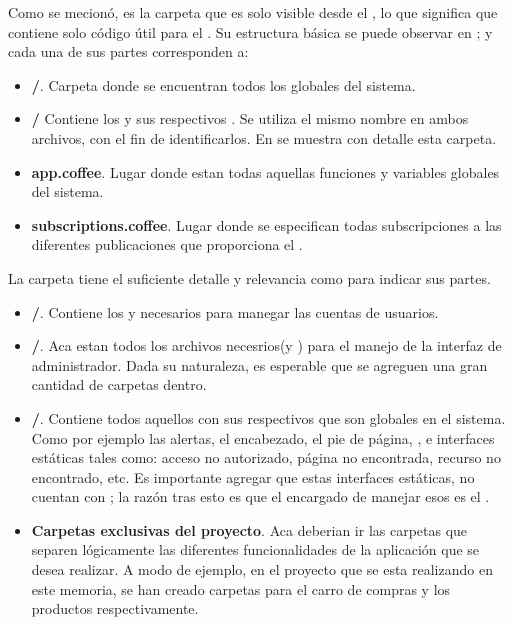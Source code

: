 Como se mecionó, \clientFolder es la carpeta que es solo visible desde el \clientSideAS, lo que significa que contiene solo código útil para el \clientAS. Su estructura básica se puede observar en ; y cada una de sus partes corresponden a:

	\begin{itemize}
		\item
			\textbf{\helpersMETEOR/}. Carpeta donde se encuentran todos los \helpersMETEOR globales del sistema.
		\item
			\textbf{\templatesMETEOR/} Contiene los \templatesMETEOR y sus respectivos \helpersMETEOR. Se utiliza el mismo nombre en ambos archivos, con el fin de identificarlos. En  se muestra con detalle esta carpeta.
		\item
			\textbf{app.coffee}. Lugar donde estan todas aquellas funciones y variables globales del sistema.
		\item
			\textbf{subscriptions.coffee}. Lugar donde se especifican todas subscripciones a las diferentes publicaciones que proporciona el \serverAS.
	\end{itemize}



La carpeta 	\templateMETEOR tiene el suficiente detalle y relevancia como para indicar sus partes.

\begin{itemize}
	\item
		\textbf{\folderAccount/}. Contiene los \templatesMETEOR y \helpersMETEOR necesarios para manegar las cuentas de usuarios. 
	\item
		\textbf{\folderDashboard/}. Aca estan todos los archivos necesrios(\templatesMETEOR y \helpersMETEOR) para el manejo de la interfaz de administrador. Dada su naturaleza, es esperable que se agreguen una gran cantidad de carpetas dentro.
	\item
		\textbf{\folderLayout/}. Contiene todos aquellos \templatesMETEOR con sus respectivos \helpersMETEOR que son globales en el sistema. Como por ejemplo las alertas, el encabezado, el pie de página, \loadingCPT, e interfaces estáticas tales como: acceso no autorizado, página no encontrada, recurso no encontrado, etc. Es importante agregar que estas interfaces estáticas, no cuentan con \helpersMETEOR; la razón tras esto es que el encargado de manejar esos \templatesMETEOR es el \packagesAS \nameRouter.
	\item
		\textbf{Carpetas exclusivas del proyecto}. Aca deberian ir las carpetas que separen lógicamente las diferentes funcionalidades de la aplicación que se desea realizar. A modo de ejemplo, en el proyecto que se esta realizando en este memoria, se han creado carpetas para el carro de compras y los productos respectivamente.
\end{itemize}

